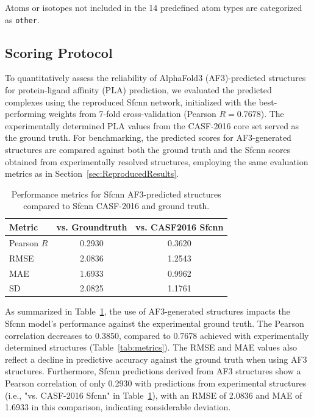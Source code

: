 \documentclass[unnumsec,webpdf,contemporary,large]{oup-authoring-template}
\theoremstyle{thmstyleone}%
\theoremstyle{thmstyletwo}%
\theoremstyle{thmstylethree}%
\begin{document}
Atoms or isotopes not included in the 14 predefined atom types are 
categorized as \texttt{other}.

\subsection{Scoring Protocol}
To quantitatively assess the reliability of AlphaFold3 (AF3)-predicted structures 
for protein-ligand affinity (PLA) prediction, we evaluated the predicted complexes 
using the reproduced Sfcnn network, initialized with the best-performing weights from 
7-fold cross-validation (Pearson $R = 0.7678$). The experimentally determined PLA values from the 
CASF-2016 core set served as the ground truth. 
For benchmarking, the predicted scores for AF3-generated structures are compared 
against both the ground truth and the Sfcnn scores obtained from experimentally 
resolved structures, employing the same evaluation metrics as 
in Section~\ref{sec:ReproducedResults}.

\begin{table}[H]
\centering
\caption{Performance metrics for Sfcnn AF3-predicted structures compared to Sfcnn CASF-2016 and ground truth.}
\label{tab:af3_metrics}
\begin{tabular}{lcc}
\toprule
Metric & vs. Groundtruth & vs.  CASF2016 Sfcnn\\
\midrule
Pearson $R$ & 0.2930 & 0.3620 \\
RMSE        & 2.0836 & 1.2543 \\
MAE         & 1.6933 & 0.9962 \\
SD          & 2.0825 & 1.1761 \\
\bottomrule
\end{tabular}
\end{table}

As summarized in Table~\ref{tab:af3_metrics}, 
the use of AF3-generated structures impacts the Sfcnn model's performance against the experimental ground truth. 
The Pearson correlation decreases to 0.3850, compared to 0.7678 achieved with experimentally determined structures (Table~\ref{tab:metrics}). 
The RMSE and MAE values also reflect a decline in predictive accuracy against the ground truth when using AF3 structures. 
Furthermore, Sfcnn predictions derived from AF3 structures show a Pearson correlation of only 0.2930 
with predictions from experimental structures (i.e., "vs. CASF-2016 Sfcnn" in Table~\ref{tab:af3_metrics}), 
with an RMSE of 2.0836 and MAE of 1.6933 in this comparison, indicating considerable deviation.
\end{document}
